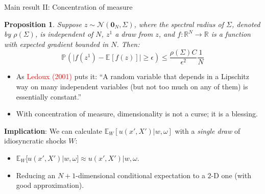\documentclass[aspectratio=169,10pt]{beamer}
\newcommand{\emphcolor}[1]{\textbf{\textcolor{emphcolorval}{#1}}}
\newtheorem{proposition}{Proposition}
\newcommand{\prob}[2][]{\ensuremath{\mathbb{P}_{#1}\left( {#2} \right)}}
\newcommand{\expec}[2][]{\ensuremath{\mathbb{E}_{{#1}}\left[ {#2} \right]}}
\begin{document}
		
		\begin{frame}[label=concentration]{Main result II: Concentration of measure}\label{Concentration}
			\begin{proposition}
				Suppose $z \sim \mathcal{N}(\mathbf{0}_N,\Sigma)$, where the spectral radius of $\Sigma$, denoted by $\rho(\Sigma)$, is independent of $N$, $z^1$ a draw from $z$, and $f:\mathbb{R}^N \rightarrow \mathbb{R}$ is a function with expected gradient bounded in $N$. Then:
				\begin{equation*}
					\prob{\big|f(z^1)-\expec{f(z)}\big|\geq \epsilon} \leq \frac{\rho(\Sigma) C}{\epsilon^2} \frac{1}{N}
				\end{equation*}
				\vspace{-0.2in}
			\end{proposition}
			\begin{itemize}
				\item As \textcolor{red}{Ledoux (2001)} puts it: ``A random variable that depends in a Lipschitz way on many independent variables (but not too much on any of them) is essentially constant.''\vspace{0.1in}
				\item With concentration of measure, dimensionality is not a curse; it is a blessing.\vspace{0.1in}
			\end{itemize}
			\emphcolor{Implication}: We can calculate $\mathbb{E}_{W}[u(x', X')|w, \omega]$ with a \textit{single draw} of idiosyncratic shocks $W$:
			\begin{itemize}
				\item $\mathbb{E}_W[u(x', X')|w, \omega]\approx u(x',X')|w,\omega$.\vspace{0.1in} 
				\item Reducing an $N+1$-dimensional conditional expectation to a $2$-D one (with good approximation). 
			\end{itemize}
\end{frame}
\end{document}
